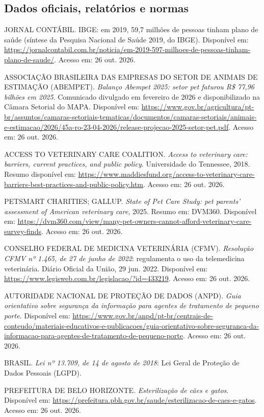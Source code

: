 \documentclass[12pt,a4paper]{article}
\begin{document}
\subsection*{Dados oficiais, relatórios e normas}
\begin{enumerate}[label={[\arabic*]},leftmargin=1.3cm,itemsep=0.2em,resume]
\item JORNAL CONTÁBIL. IBGE: em 2019, 59,7 milhões de pessoas tinham plano de saúde (síntese da Pesquisa Nacional de Saúde 2019, do IBGE). Disponível em: \url{https://jornalcontabil.com.br/noticia/em-2019-597-milhoes-de-pessoas-tinham-plano-de-saude/}. Acesso em: 26 out. 2026.
\item ASSOCIAÇÃO BRASILEIRA DAS EMPRESAS DO SETOR DE ANIMAIS DE ESTIMAÇÃO (ABEMPET). \textit{Balanço Abempet 2025: setor pet faturou R\$ 77,96 bilhões em 2025}. Comunicado divulgado em fevereiro de 2026 e disponibilizado na Câmara Setorial do MAPA. Disponível em: \url{https://www.gov.br/agricultura/pt-br/assuntos/camaras-setoriais-tematicas/documentos/camaras-setoriais/animais-e-estimacao/2026/45a-ro-23-04-2026/release-projecao-2025-setor-pet.pdf}. Acesso em: 26 out. 2026.
\item ACCESS TO VETERINARY CARE COALITION. \textit{Access to veterinary care: barriers, current practices, and public policy}. Universidade do Tennessee, 2018. Resumo disponível em: \url{https://www.maddiesfund.org/access-to-veterinary-care-barriers-best-practices-and-public-policy.htm}. Acesso em: 26 out. 2026.
\item PETSMART CHARITIES; GALLUP. \textit{State of Pet Care Study: pet parents' assessment of American veterinary care}, 2025. Resumo em: DVM360. Disponível em: \url{https://dvm360.com/view/many-pet-owners-cannot-afford-veterinary-care-survey-finds}. Acesso em: 26 out. 2026.
\item CONSELHO FEDERAL DE MEDICINA VETERINÁRIA (CFMV). \textit{Resolução CFMV nº 1.465, de 27 de junho de 2022}: regulamenta o uso da telemedicina veterinária. Diário Oficial da União, 29 jun. 2022. Disponível em: \url{https://www.legisweb.com.br/legislacao/?id=433219}. Acesso em: 26 out. 2026.
\item AUTORIDADE NACIONAL DE PROTEÇÃO DE DADOS (ANPD). \textit{Guia orientativo sobre segurança da informação para agentes de tratamento de pequeno porte}. Disponível em: \url{https://www.gov.br/anpd/pt-br/centrais-de-conteudo/materiais-educativos-e-publicacoes/guia-orientativo-sobre-seguranca-da-informacao-para-agentes-de-tratamento-de-pequeno-porte}. Acesso em: 26 out. 2026.
\item BRASIL. \textit{Lei nº 13.709, de 14 de agosto de 2018}: Lei Geral de Proteção de Dados Pessoais (LGPD).
\item PREFEITURA DE BELO HORIZONTE. \textit{Esterilização de cães e gatos}. Disponível em: \url{https://prefeitura.pbh.gov.br/saude/esterilizacao-de-caes-e-gatos}. Acesso em: 26 out. 2026.
\end{enumerate}
\end{document}
